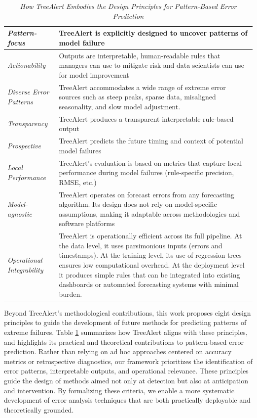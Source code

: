 \documentclass[ijds,sglanonrev]{informs4}
\begin{document}
\begin{table}[H]
\centering
\caption{\textit{How TreeAlert Embodies the Design Principles for Pattern-Based Error Prediction}}
\small
\begin{tabular}{|m{2.5cm}|m{13cm}|}
\hline
\centering\textit{Pattern-focus} &
TreeAlert is explicitly designed to uncover patterns of model failure \\
\hline
\centering\textit{Actionability} &
Outputs are interpretable, human-readable rules that managers can use to mitigate risk and data scientists can use for model improvement \\
\hline
\centering\textit{Diverse Error Patterns} &
TreeAlert accommodates a wide range of extreme error sources such as steep peaks, sparse data, misaligned seasonality, and slow model adjustment. \\
\hline
\centering\textit{Transparency} &
TreeAlert produces a transparent interpretable rule-based output \\
\hline
\centering\textit{Prospective} &
TreeAlert predicts the future timing and context of potential model failures \\
\hline
\centering\textit{Local Performance} &
TreeAlert’s evaluation is based on metrics that capture local performance during model failures (rule-specific precision, RMSE, etc.) \\
\hline
\centering\textit{Model-agnostic} &
TreeAlert operates on forecast errors from any forecasting algorithm. Its design does not rely on model-specific assumptions, making it adaptable across methodologies and software platforms \\
\hline
\centering\textit{Operational Integrability} &
TreeAlert is operationally efficient across its full pipeline. At the data level, it uses parsimonious inputs (errors and timestamps). At the training level, its use of regression trees ensures low computational overhead. At the deployment level it produces simple rules that can be integrated into existing dashboards or automated forecasting systems with minimal burden. \\
\hline
\end{tabular}
\label{tab:design}
\end{table}

Beyond TreeAlert's methodological contributions, this work proposes eight design principles to guide the development of future methods for predicting patterns of extreme failures. Table \ref{tab:design} summarizes how TreeAlert aligns with these principles, and highlights its practical and theoretical contributions to pattern-based error prediction. Rather than relying on ad hoc approaches centered on accuracy metrics or retrospective diagnostics, our framework prioritizes the identification of error patterns, interpretable outputs, and operational relevance. These principles guide the design of methods aimed not only at detection but also at anticipation and intervention. By formalizing these criteria, we enable a more systematic development of error analysis techniques that are both practically deployable and theoretically grounded.
\end{document}
